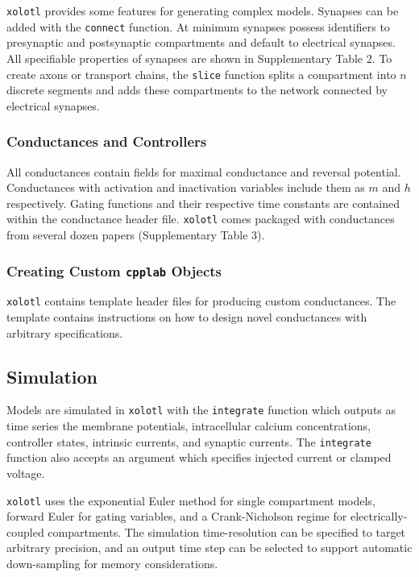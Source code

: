 \documentclass{frontiersSCNS} %
\begin{document}
\texttt{xolotl} provides some features for generating complex models. Synapses can be added with the \texttt{connect} function. At minimum synapses possess identifiers to presynaptic and postsynaptic compartments and default to electrical synapses. All specifiable properties of synapses are shown in Supplementary Table 2. To create axons or transport chains, the \texttt{slice} function splits a compartment into $n$ discrete segments and adds these compartments to the network connected by electrical synapses.

\subsubsection{Conductances and Controllers}

All conductances contain fields for maximal conductance and reversal potential. Conductances with activation and inactivation variables include them as $m$ and $h$ respectively. Gating functions and their respective time constants are contained within the conductance header file. \texttt{xolotl} comes packaged with conductances from several dozen papers (Supplementary Table 3).

\subsubsection{Creating Custom \texttt{cpplab} Objects}

\texttt{xolotl} contains template header files for producing custom conductances. The template contains instructions on how to design novel conductances with arbitrary specifications.

\subsection{Simulation}

Models are simulated in \texttt{xolotl} with the \texttt{integrate} function which outputs as time series the membrane potentials, intracellular calcium concentrations, controller states, intrinsic currents, and synaptic currents. The \texttt{integrate} function also accepts an argument which specifies injected current or clamped voltage. 

\texttt{xolotl} uses the exponential Euler method for single compartment models, forward Euler for gating variables, and a Crank-Nicholson regime for electrically-coupled compartments. The simulation time-resolution can be specified to target arbitrary precision, and an output time step can be selected to support automatic down-sampling for memory considerations.
\end{document}
